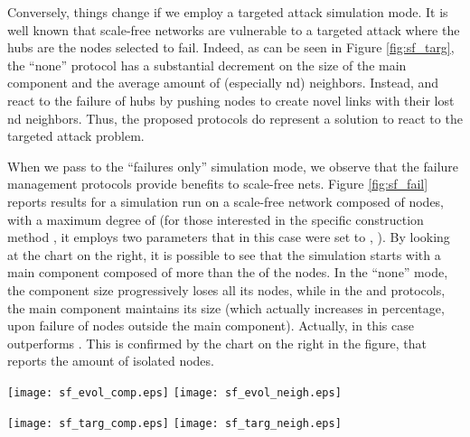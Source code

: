\documentclass[10pt, conference, compsocconf]{IEEEtran}
\begin{document}
Conversely, things change if we employ a targeted attack simulation mode. It is well known that scale-free networks are vulnerable to a targeted attack where the hubs are the nodes selected to fail. Indeed, as can be seen in Figure \ref{fig:sf_targ}, the ``none'' protocol has a substantial decrement on the size of the main component and the average amount of (especially nd) neighbors.
Instead,  and  react to the failure of hubs by pushing nodes to create novel links with their lost nd neighbors. Thus, the proposed protocols do represent a solution to react to the targeted attack problem.

When we pass to the ``failures only'' simulation mode, we observe that the failure management protocols provide benefits to scale-free nets. Figure \ref{fig:sf_fail} reports results for a simulation run on a scale-free network composed of  nodes, with a maximum degree of  (for those interested in the specific construction method \cite{Aiello00arandom}, it employs two parameters that in this case were set to , ). 
By looking at the chart on the right, it is possible to see that the simulation starts with a main component composed of more than the  of the nodes. In the ``none'' mode, the component size progressively loses all its nodes, while in the  and  protocols, the main component maintains its size (which actually increases in percentage, upon failure of nodes outside the main component). Actually, in this case  outperforms . This is confirmed by the chart on the right in the figure, that reports the amount of isolated nodes.

\begin{figure*}[t]
   \centering
   \texttt{[image: sf\_evol\_comp.eps]}
   \texttt{[image: sf\_evol\_neigh.eps]}
   \caption{Scale-free networks: average size of the main components, average amount of -neighbors (referred as ``n1'') and -neighbors (referred as ``n2''), during the evolution of the network.}
   \label{fig:sf_evol}
\end{figure*}

\begin{figure*}[t]
   \centering
   \texttt{[image: sf\_targ\_comp.eps]}
   \texttt{[image: sf\_targ\_neigh.eps]}
   \caption{Scale-free networks: average size of the main components, average amount of -neighbors (referred as ``n1'') and -neighbors (referred as ``n2''), under a targeted attack.}
   \label{fig:sf_targ}
\end{figure*}
\end{document}
